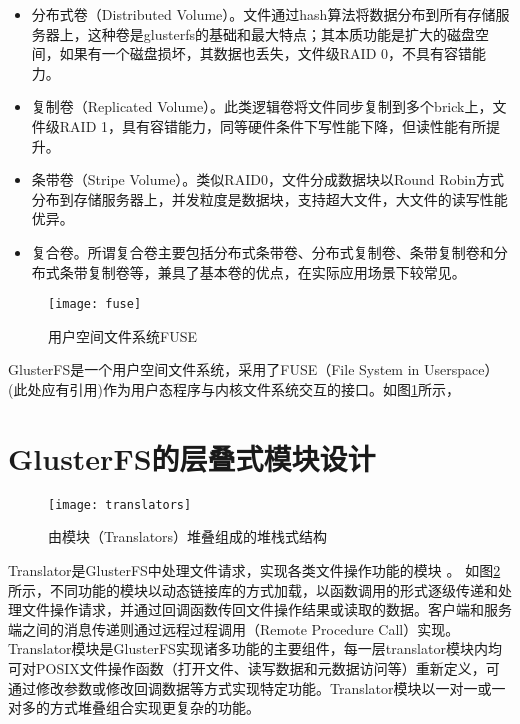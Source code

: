\begin{itemize}
    \item 分布式卷（Distributed Volume）。文件通过hash算法将数据分布到所有存储服务器上，这种卷是glusterfs的基础和最大特点；其本质功能是扩大的磁盘空间，如果有一个磁盘损坏，其数据也丢失，文件级RAID 0，不具有容错能力。
    \item 复制卷（Replicated Volume）。此类逻辑卷将文件同步复制到多个brick上，文件级RAID 1，具有容错能力，同等硬件条件下写性能下降，但读性能有所提升。
    \item 条带卷（Stripe Volume）。类似RAID0，文件分成数据块以Round Robin方式分布到存储服务器上，并发粒度是数据块，支持超大文件，大文件的读写性能优异。
    \item 复合卷。所谓复合卷主要包括分布式条带卷、分布式复制卷、条带复制卷和分布式条带复制卷等，兼具了基本卷的优点，在实际应用场景下较常见。
\end{itemize}
\begin{figure}[htp]
\centering
\texttt{[image: fuse]}
\caption{用户空间文件系统FUSE}
\label{fig:fuse}
\end{figure}
GlusterFS是一个用户空间文件系统，采用了FUSE（File System in Userspace）{\color{red}(此处应有引用)}作为用户态程序与内核文件系统交互的接口。如图\ref{fig:fuse}所示，

\section{GlusterFS的层叠式模块设计}
\begin{figure}[htp]
\centering
\texttt{[image: translators]}
\caption{由模块（Translators）堆叠组成的堆栈式结构}
\label{fig:translators}
\end{figure}
Translator是GlusterFS中处理文件请求，实现各类文件操作功能的模块
\cite{BWFS}\cite{DPFS}。
如图\ref{fig:translators}所示，不同功能的模块以动态链接库的方式加载，以函数调用的形式逐级传递和处理文件操作请求，并通过回调函数传回文件操作结果或读取的数据。客户端和服务端之间的消息传递则通过远程过程调用（Remote Procedure Call）实现。
Translator模块是GlusterFS实现诸多功能的主要组件，每一层translator模块内均可对POSIX文件操作函数（打开文件、读写数据和元数据访问等）重新定义，可通过修改参数或修改回调数据等方式实现特定功能。Translator模块以一对一或一对多的方式堆叠组合实现更复杂的功能。

